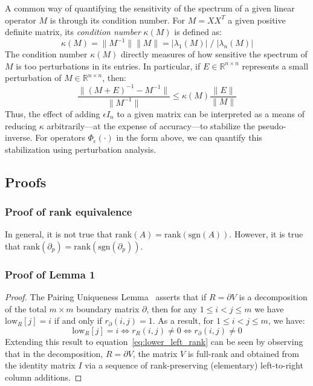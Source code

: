 \documentclass[10pt]{article}
\numberwithin{equation}{section}
\newcommand{\+}{%
	\raisebox{0.18ex}{\scaleobj{0.55}{+}}
}
\theoremstyle{definition}
\theoremstyle{definition}
\begin{document}
A common way of quantifying the sensitivity of the spectrum of a given linear operator $M$ is through its condition number. For $M = X X^T$ a given positive definite matrix, its \emph{condition number} $\kappa(M)$ is defined as: 
\begin{equation}
	\kappa(M) = \lVert M^{-1} \rVert \lVert M \rVert = \lvert \lambda_1(M) \rvert \; / \; \lvert \lambda_n(M) \rvert
\end{equation}
The condition number $\kappa(M)$ directly measures of how sensitive the spectrum of $M$ is too perturbations in its entries. 
In particular, if $E \in \mathbb{R}^{n \times n}$ represents a small perturbation of $M \in \mathbb{R}^{n \times n}$, then: 
\begin{equation}
\frac{\lVert (M + E)^{-1}  - M^{-1} \rVert}{\lVert M^{-1} \rVert} \leq \kappa(M) \frac{\lVert E \rVert}{ \lVert M \rVert }
\end{equation}
Thus, the effect of adding $\epsilon I_n$ to a given matrix can be interpreted as a means of reducing $\kappa$ arbitrarily---at the expense of accuracy---to stabilize the pseudo-inverse. 
For operators $\Phi_\epsilon(\cdot)$ in the form above, we can quantify this stabilization using perturbation analysis. 

\subsection{Proofs}
\subsubsection*{Proof of rank equivalence}
In general, it is not true that $\mathrm{rank}(A) = \mathrm{rank}(\mathrm{sgn}(A))$. 
However, it is true that $\mathrm{rank}(\partial_p) = \mathrm{rank}(\mathrm{sgn}(\partial_p))$.
\subsubsection*{Proof of Lemma 1}
\begin{proof}
	The Pairing Uniqueness Lemma~\cite{dey2022computational} asserts that if $R = \partial V$ is a decomposition of the total $m \times m$ boundary matrix $\partial$, then for any $1 \leq i < j \leq m$ we have $\mathrm{low}_R[j] = i$ if and only if $r_\partial(i,j) = 1$. 
	As a result, for $1 \leq i < j \leq m$, we have:
\begin{equation}
	\mathrm{low}_R[j] = i \iff r_R(i,j) \neq 0 \iff r_\partial(i,j) \neq 0
\end{equation} 
Extending this result to equation~\eqref{eq:lower_left_rank} can be seen by observing that in the decomposition, $R = \partial V$, the matrix $V$ is full-rank and obtained from the identity matrix $I$ via a sequence of rank-preserving (elementary) left-to-right column additions.  
\end{proof}
\end{document}
